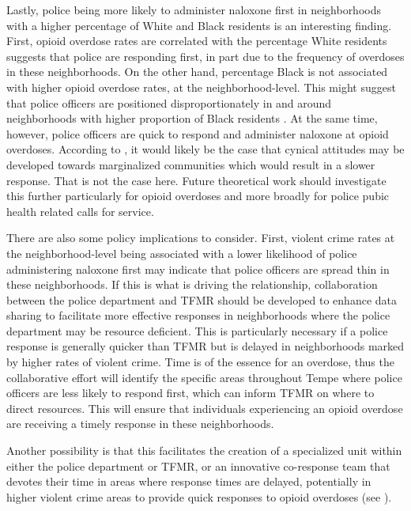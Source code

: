Lastly, police being more likely to administer naloxone first in neighborhoods with a higher percentage of White and Black residents is an interesting finding. First, opioid overdose rates are correlated with the percentage White residents suggests that police are responding first, in part due to the frequency of overdoses in these neighborhoods. On the other hand, percentage Black is not associated with higher opioid overdose rates, at the neighborhood-level. This might suggest that police officers are positioned disproportionately in and around neighborhoods with higher proportion of Black residents \parencite{black_manners_1980}. At the same time, however, police officers are quick to respond and administer naloxone at opioid overdoses. According to \textcite{klinger_negotiating_1997}, it would likely be the case that cynical attitudes may be developed towards marginalized communities which would result in a slower response. That is not the case here. Future theoretical work should investigate this further particularly for opioid overdoses and more broadly for police pubic health related calls for service. 

There are also some policy implications to consider. First, violent crime rates at the neighborhood-level being associated with a lower likelihood of police administering naloxone first may indicate that police officers are spread thin in these neighborhoods. If this is what is driving the relationship, collaboration between the police department and TFMR should be developed to enhance data sharing to facilitate more effective responses in neighborhoods where the police department may be resource deficient. This is particularly necessary if a police response is generally quicker than TFMR but is delayed in neighborhoods marked by higher rates of violent crime. Time is of the essence for an overdose, thus the collaborative effort will identify the specific areas throughout Tempe where police officers are less likely to respond first, which can inform TFMR on where to direct resources. This will ensure that individuals experiencing an opioid overdose are receiving a timely response in these neighborhoods. 

Another possibility is that this facilitates the creation of a specialized unit within either the police department or TFMR, or an innovative co-response team that devotes their time in areas where response times are delayed, potentially in higher violent crime areas to provide quick responses to opioid overdoses (see \cite{reuland_improving_2010, white_co-responder_2018}). 

